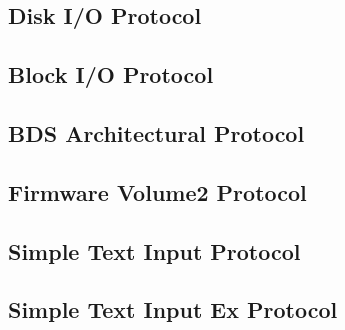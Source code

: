 \clearpage

\subsection{Disk \acs{I/O} Protocol}


\clearpage

\subsection{Block \acs{I/O} Protocol}


\clearpage

\subsection{\acf{BDS} Architectural Protocol}



\clearpage

\subsection{Firmware Volume2 Protocol}



\clearpage

\subsection{Simple Text Input Protocol}


\clearpage

\subsection{Simple Text Input Ex Protocol}


